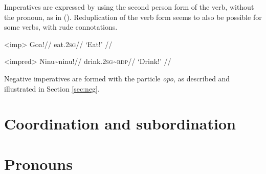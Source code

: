 \documentclass[12pt]{article}
\begin{document}
Imperatives are expressed by using the second person form of the verb, without the pronoun, as in (). Reduplication of the verb form seems to also be possible for some verbs, with rude connotations.

\ex<imp>
\begingl %
\gla Goa!//
\glb eat.\textsc{2sg}//
\glft `Eat!' //
\endgl
\xe

\ex<impred>
\begingl %
\gla Ninu\textasciitilde ninu!//
\glb drink.\textsc{2sg}\textasciitilde \textsc{rdp}//
\glft `Drink!' // 
\endgl
\xe

Negative imperatives are formed with the particle \textit{opo}, as described and illustrated in Section \ref{sec:neg}.

\section{Coordination and subordination}

\section{Pronouns}
\end{document}
